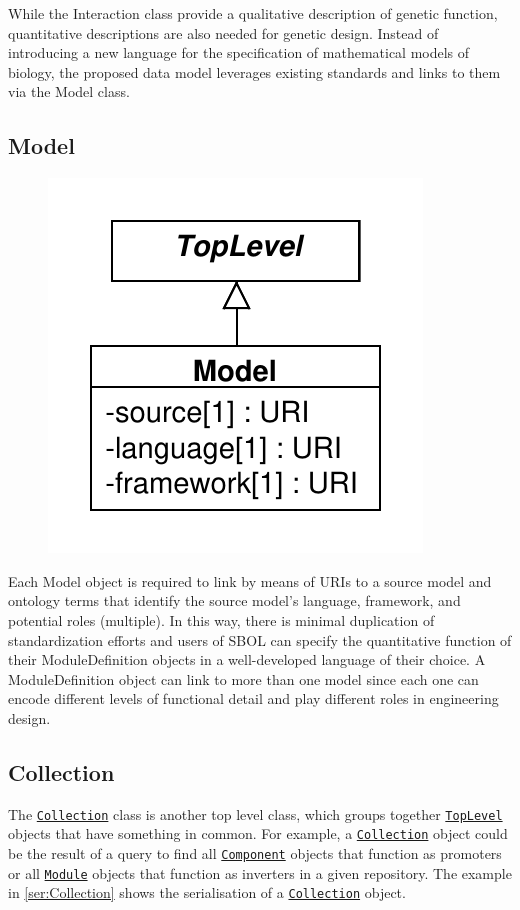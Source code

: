 \documentclass[draftspec]{sbmlpkgspec}
\newcommand{\sbol}[1]{\texttt{\hyperref[sec:#1]{#1}}}
\begin{document}
While the Interaction class provide a qualitative description of genetic function, quantitative descriptions are also needed for genetic design. Instead of introducing a new language for the specification of mathematical models of biology, the proposed data model leverages existing standards and links to them via the Model class. 




\subsection{Model}
\label{sec:Model}

\begin{figure}[ht]
\begin{center}
\includegraphics[scale=0.6]{uml/model}
\caption[]{}
\label{uml:model}
\end{center}
\end{figure}

Each Model object is required to link by means of URIs to a source model and ontology terms that identify the source model's language, framework, and potential roles (multiple). In this way, there is minimal duplication of standardization efforts and users of SBOL can specify the quantitative function of their ModuleDefinition objects in a well-developed language of their choice. A ModuleDefinition object can link to more than one model since each one can encode different levels of functional detail and play different roles in engineering design. 




\subsection {Collection}
\label{sec:Collection}
The \sbol{Collection} class is another top level class, which groups together \sbol{TopLevel} objects that have something in common. For example, a \sbol{Collection} object could be the result of a query to find all \sbol{Component} objects that function as promoters or all \sbol{Module} objects that function as inverters in a given repository. The example in \ref{ser:Collection} shows the serialisation of a \sbol{Collection} object. 
\end{document}
